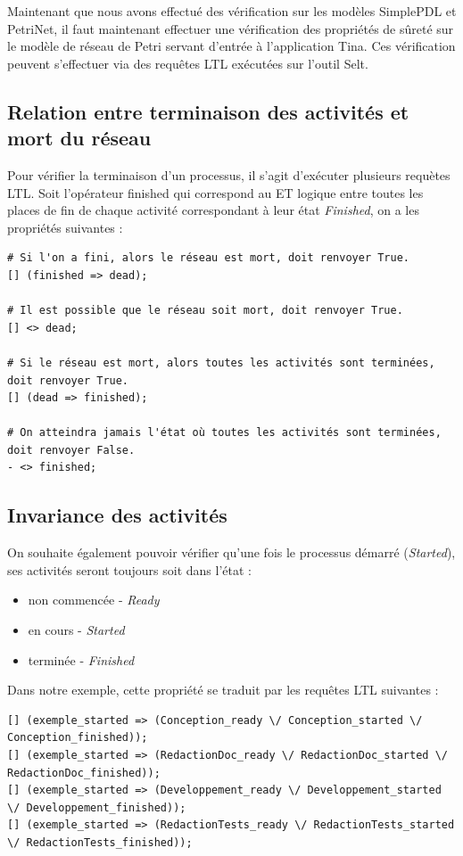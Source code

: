 \documentclass{report}
\begin{document}
Maintenant que nous avons effectué des vérification sur les modèles SimplePDL et PetriNet, il faut maintenant effectuer une vérification des propriétés de sûreté sur le modèle de réseau de Petri servant d'entrée à l'application Tina. Ces vérification peuvent s'effectuer via des requêtes LTL exécutées sur l'outil Selt.

\subsection{Relation entre terminaison des activités et mort du réseau}

Pour vérifier la terminaison d'un processus, il s'agit d'exécuter plusieurs requètes LTL.
Soit l'opérateur finished qui correspond au ET logique entre toutes les places de fin de chaque activité correspondant à leur état \textit{Finished}, on a les propriétés suivantes :\\

\begin{verbatim}
# Si l'on a fini, alors le réseau est mort, doit renvoyer True.
[] (finished => dead);

# Il est possible que le réseau soit mort, doit renvoyer True.
[] <> dead;

# Si le réseau est mort, alors toutes les activités sont terminées, doit renvoyer True.
[] (dead => finished);

# On atteindra jamais l'état où toutes les activités sont terminées, doit renvoyer False.
- <> finished;
\end{verbatim}

\subsection{Invariance des activités}

On souhaite également pouvoir vérifier qu'une fois le processus démarré (\textit{Started}), ses activités seront toujours soit dans l'état :
\begin{itemize}
\item non commencée - \textit{Ready}
\item en cours - \textit{Started}
\item terminée - \textit{Finished}
\end{itemize}
Dans notre exemple, cette propriété se traduit par les requêtes LTL suivantes :

\begin{verbatim}
[] (exemple_started => (Conception_ready \/ Conception_started \/ Conception_finished));
[] (exemple_started => (RedactionDoc_ready \/ RedactionDoc_started \/ RedactionDoc_finished));
[] (exemple_started => (Developpement_ready \/ Developpement_started \/ Developpement_finished));
[] (exemple_started => (RedactionTests_ready \/ RedactionTests_started \/ RedactionTests_finished));
\end{verbatim}
\end{document}
